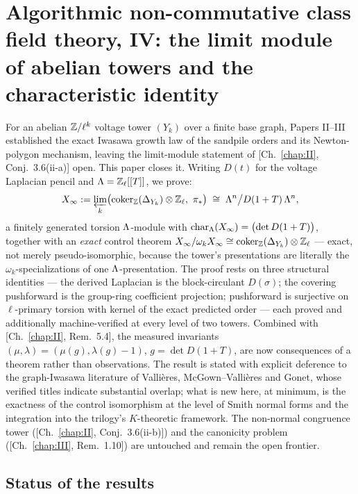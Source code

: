 \chapter[IV. The limit module of abelian towers and the characteristic identity]{Algorithmic non-commutative class field theory, IV: the limit module of abelian towers and the characteristic identity}\label{chap:IV}
\begin{chapterabstract}
For an abelian $\mathbb{Z}/\ell^k$ voltage tower $(Y_k)$ over a finite base graph, Papers
II--III established the exact Iwasawa growth law of the sandpile orders and its
Newton-polygon mechanism, leaving the limit-module statement of
[Ch.~\ref{chap:II}, Conj.~3.6(ii-a)] open. This paper closes it. Writing $D(t)$ for the voltage
Laplacian pencil and $\Lambda=\mathbb{Z}_\ell[[T]]$, we prove:
\[
X_\infty:=\varprojlim_k\bigl(\coker_\Z(\Delta_{Y_k})\otimes\Zl,\ \pi_*\bigr)
\;\cong\;\La^n\big/D(1+T)\,\La^n,
\]
a finitely generated torsion $\Lambda$-module with
$\operatorname{char}_{\Lambda}(X_\infty)=\bigl(\det D(1+T)\bigr)$, together with an \emph{exact} control
theorem $X_\infty/\omega_kX_\infty\cong\operatorname{coker}_{\mathbb{Z}}(\Delta_{Y_k})\otimes\mathbb{Z}_\ell$ --- exact,
not merely pseudo-isomorphic, because the tower's presentations are literally the
$\omega_k$-specializations of one $\Lambda$-presentation. The proof rests on three
structural identities --- the derived Laplacian is the block-circulant $D(\sigma)$;
the covering pushforward is the group-ring coefficient projection; pushforward is
surjective on $\ell$-primary torsion with kernel of the exact predicted order --- each
proved and additionally machine-verified at every level of two towers. Combined with
[Ch.~\ref{chap:II}, Rem.~5.4], the measured invariants $(\mu,\lambda)=(\mu(g),\lambda(g)-1)$,
$g=\det D(1+T)$, are now consequences of a theorem rather than observations. The
result is stated with explicit deference to the graph-Iwasawa literature of
Vallières, McGown--Vallières and Gonet, whose verified titles indicate substantial
overlap; what is new here, at minimum, is the exactness of the control isomorphism at
the level of Smith normal forms and the integration into the trilogy's $K$-theoretic
framework. The non-normal congruence tower ([Ch.~\ref{chap:II}, Conj.~3.6(ii-b)]) and the canonicity
problem ([Ch.~\ref{chap:III}, Rem.~1.10]) are untouched and remain the open frontier.
\end{chapterabstract}

\section*{Status of the results}

